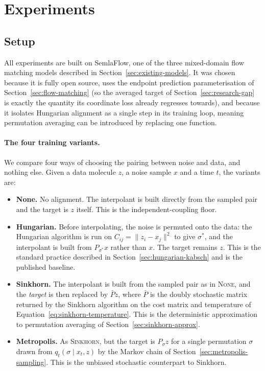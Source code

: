 \section{Experiments}

\subsection{Setup}

All experiments are built on SemlaFlow, one of the three mixed-domain flow matching models
described in Section~\ref{sec:existing-models}. It was chosen because it is fully open source,
uses the endpoint prediction parameterisation of Section~\ref{sec:flow-matching} (so the
averaged target of Section~\ref{sec:research-gap} is exactly the quantity its coordinate loss
already regresses towards), and because it isolates Hungarian alignment as a single step in its
training loop, meaning permutation averaging can be introduced by replacing one function.

\paragraph{The four training variants.}
We compare four ways of choosing the pairing between noise and data, and nothing else. Given a data
molecule $z$, a noise sample $x$ and a time $t$, the variants are:

\begin{itemize}
    \item \textbf{None.} No alignment. The interpolant is built directly from the sampled pair and
        the target is $z$ itself. This is the independent-coupling floor.
    \item \textbf{Hungarian.} Before interpolating, the noise is permuted onto the data: the
        Hungarian algorithm is run on $C_{ij} = \|z_i - x_j\|^2$ to give $\sigma^*$, and the
        interpolant is built from $P_{\sigma^*} x$ rather than $x$. The target remains $z$. This is
        the standard practice described in Section~\ref{sec:hungarian-kabsch} and is the published
        baseline.
    \item \textbf{Sinkhorn.} The interpolant is built from the sampled pair as in \textsc{None},
        and the \emph{target} is then replaced by $\bar{P} z$, where $\bar{P}$ is the doubly
        stochastic matrix returned by the Sinkhorn algorithm on the cost matrix and temperature of
        Equation~\eqref{eq:sinkhorn-temperature}. This is the deterministic approximation to
        permutation averaging of Section~\ref{sec:sinkhorn-approx}.
    \item \textbf{Metropolis.} As \textsc{Sinkhorn}, but the target is $P_\sigma z$ for a single
        permutation $\sigma$ drawn from $q_t(\sigma \mid x_t, z)$ by the Markov chain of
        Section~\ref{sec:metropolis-sampling}. This is the unbiased stochastic counterpart to
        Sinkhorn.
\end{itemize}

